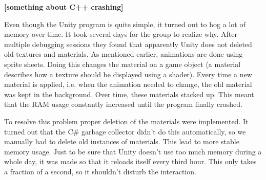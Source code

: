 \textbf{[something about C++ crashing]}

Even though the Unity program is quite simple, it turned out to hog a lot of memory over time. It took several days for the group to realize why. After multiple debugging sessions they found that apparently Unity does not deleted old textures and materials. As mentioned earlier, animations are done using sprite sheets. Doing this changes the material on a game object (a material describes how a texture should be displayed using a shader). Every time a new material is applied, i.e. when the animation needed to change, the old material was kept in the background. Over time, these materials stacked up. This meant that the RAM usage constantly increased until the program finally crashed.

To resolve this problem proper deletion of the materials were implemented. It turned out that the {C\#} garbage collector didn't do this automatically, so we manually had to delete old instances of materials. This lead to more stable memory usage. Just to be sure that Unity doesn't use too much memory during a whole day, it was made so that it reloads itself every third hour. This only takes a fraction of a second, so it shouldn't disturb the interaction.
